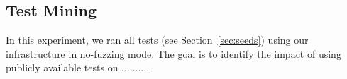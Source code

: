 \documentclass[10pt,conference,anonymous]{IEEEtran}
\begin{document}
\subsection{Test Mining}

In this experiment, we ran all tests (see Section~\ref{sec:seeds})
using our infrastructure in no-fuzzing mode. The goal is to identify
the impact of using publicly available tests on .......... 

\Igor{
}




\end{document}
